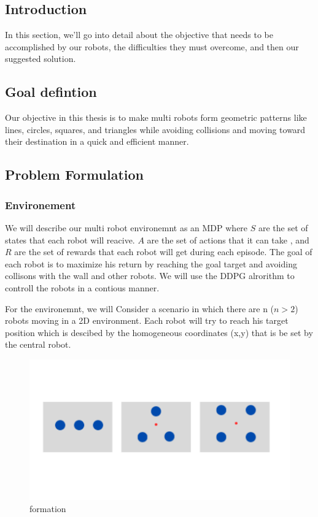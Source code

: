 \documentclass[12pt]{extarticle}
\begin{document}
\pagebreak

 

\subsection{Introduction}
 In this section, we'll go into  detail about the objective that needs to be accomplished by our robots, the difficulties they must overcome, and then our suggested solution.
 
\subsection{Goal defintion}
Our objective in this thesis is to make multi robots  form geometric patterns like lines, circles, squares, and triangles while avoiding collisions and moving toward their destination in a quick and efficient manner. 



\subsection{Problem Formulation}
 

\subsubsection{Environement}

We will describe our multi robot environemnt as an MDP where $S$ are the set of states that each robot will reacive. $A$ are the set of actions that it can take , and $R$ are the set of rewards that each robot will get during each episode. The  goal of each robot is to  maximize his return by reaching the goal target and avoiding collisons with the wall and other  robots. We will use the DDPG alrorithm to controll the robots in a contious manner.




For the environemnt, we will Consider a scenario in which there are n ($n >  2$) robots moving in a 2D environment. Each robot will try to reach his target position which is descibed by the homogeneous coordinates (x,y)  that is be set by the  central robot.


 
 \begin{figure}[h]  
\centering
\includegraphics[scale=0.4]{formation}
\caption[formation]{formation}
\end{figure}
\end{document}
